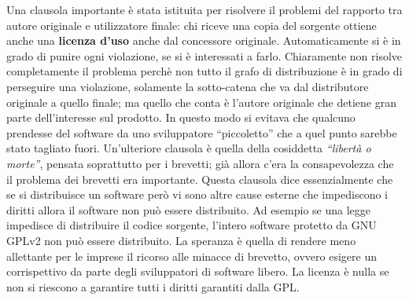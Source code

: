 Una clausola importante è stata istituita per risolvere il problemi del rapporto tra autore originale e utilizzatore finale: chi riceve una copia del sorgente ottiene anche una \textbf{licenza d'uso} anche dal concessore originale. Automaticamente si è in grado di punire ogni violazione, se si è interessati a farlo. Chiaramente non risolve completamente il problema perchè non tutto il grafo di distribuzione è in grado di perseguire una violazione, solamente la sotto-catena che va dal distributore originale a quello finale; ma quello che conta è l'autore originale che detiene gran parte dell'interesse sul prodotto. In questo modo si evitava che qualcuno prendesse del software da uno sviluppatore ``piccoletto'' che a quel punto sarebbe stato tagliato fuori. 
\linebreak
\linebreak
Un'ulteriore clausola è quella della cosiddetta \textit{``libertà o morte''}, pensata soprattutto per i brevetti; già allora c'era la consapevolezza che il problema dei brevetti era importante. Questa clausola dice essenzialmente che se si distribuisce un software però vi sono altre cause esterne che impediscono i diritti allora il software non può essere distribuito. Ad esempio se una legge impedisce di distribuire il codice sorgente, l'intero software protetto da GNU GPLv2 non può essere distribuito. La speranza è quella di rendere meno allettante per le imprese il ricorso alle minacce di brevetto, ovvero esigere un corrispettivo da parte degli sviluppatori di software libero. La licenza è nulla se non si riescono a garantire tutti i diritti garantiti dalla GPL.

